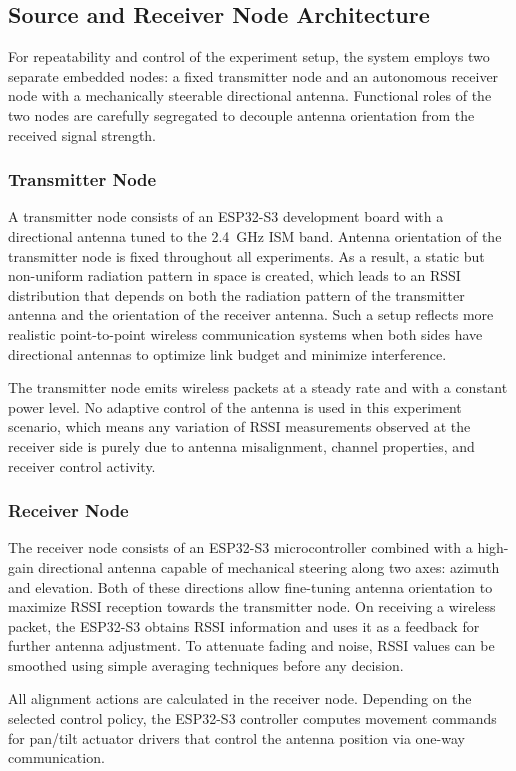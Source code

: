 \subsection{Source and Receiver Node Architecture}

For repeatability and control of the experiment setup, the system employs two separate embedded nodes: a fixed transmitter node and an autonomous receiver node with a mechanically steerable directional antenna. Functional roles of the two nodes are carefully segregated to decouple antenna orientation from the received signal strength.

\subsubsection{Transmitter Node}

A transmitter node consists of an ESP32-S3 development board with a directional antenna tuned to the 2.4~GHz ISM band. Antenna orientation of the transmitter node is fixed throughout all experiments. As a result, a static but non-uniform radiation pattern in space is created, which leads to an RSSI distribution that depends on both the radiation pattern of the transmitter antenna and the orientation of the receiver antenna. Such a setup reflects more realistic point-to-point wireless communication systems when both sides have directional antennas to optimize link budget and minimize interference.

The transmitter node emits wireless packets at a steady rate and with a constant power level. No adaptive control of the antenna is used in this experiment scenario, which means any variation of RSSI measurements observed at the receiver side is purely due to antenna misalignment, channel properties, and receiver control activity.

\subsubsection{Receiver Node}

The receiver node consists of an ESP32-S3 microcontroller combined with a high-gain directional antenna capable of mechanical steering along two axes: azimuth and elevation. Both of these directions allow fine-tuning antenna orientation to maximize RSSI reception towards the transmitter node. On receiving a wireless packet, the ESP32-S3 obtains RSSI information and uses it as a feedback for further antenna adjustment. To attenuate fading and noise, RSSI values can be smoothed using simple averaging techniques before any decision.

All alignment actions are calculated in the receiver node. Depending on the selected control policy, the ESP32-S3 controller computes movement commands for pan/tilt actuator drivers that control the antenna position via one-way communication.